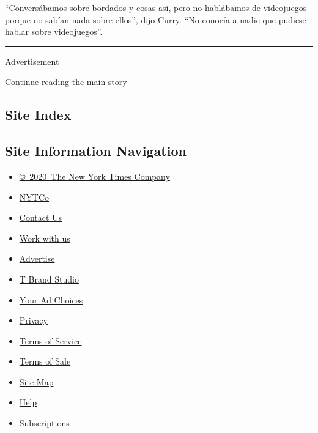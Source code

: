 ``Conversábamos sobre bordados y cosas así, pero no hablábamos de
videojuegos porque no sabían nada sobre ellos'', dijo Curry. ``No
conocía a nadie que pudiese hablar sobre videojuegos''.

\begin{center}\rule{0.5\linewidth}{\linethickness}\end{center}

Advertisement

\protect\hyperlink{after-bottom}{Continue reading the main story}

\hypertarget{site-index}{%
\subsection{Site Index}\label{site-index}}

\hypertarget{site-information-navigation}{%
\subsection{Site Information
Navigation}\label{site-information-navigation}}

\begin{itemize}
\tightlist
\item
  \href{https://help.nytimes3xbfgragh.onion/hc/en-us/articles/115014792127-Copyright-notice}{©~2020~The
  New York Times Company}
\end{itemize}

\begin{itemize}
\tightlist
\item
  \href{https://www.nytco.com/}{NYTCo}
\item
  \href{https://help.nytimes3xbfgragh.onion/hc/en-us/articles/115015385887-Contact-Us}{Contact
  Us}
\item
  \href{https://www.nytco.com/careers/}{Work with us}
\item
  \href{https://nytmediakit.com/}{Advertise}
\item
  \href{http://www.tbrandstudio.com/}{T Brand Studio}
\item
  \href{https://www.nytimes3xbfgragh.onion/privacy/cookie-policy\#how-do-i-manage-trackers}{Your
  Ad Choices}
\item
  \href{https://www.nytimes3xbfgragh.onion/privacy}{Privacy}
\item
  \href{https://help.nytimes3xbfgragh.onion/hc/en-us/articles/115014893428-Terms-of-service}{Terms
  of Service}
\item
  \href{https://help.nytimes3xbfgragh.onion/hc/en-us/articles/115014893968-Terms-of-sale}{Terms
  of Sale}
\item
  \href{https://spiderbites.nytimes3xbfgragh.onion}{Site Map}
\item
  \href{https://help.nytimes3xbfgragh.onion/hc/en-us}{Help}
\item
  \href{https://www.nytimes3xbfgragh.onion/subscription?campaignId=37WXW}{Subscriptions}
\end{itemize}
